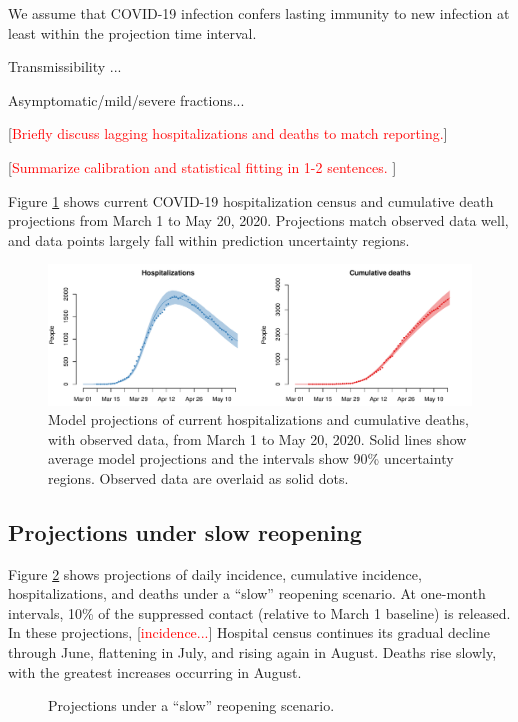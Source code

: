 \documentclass[11pt]{article}
\newcommand{\comment}[1]{[\textcolor{red}{#1}]}
\begin{document}
We assume that COVID-19 infection confers lasting immunity to new infection at least within the projection time interval.  

Transmissibility ...

Asymptomatic/mild/severe fractions...

\comment{Briefly discuss lagging hospitalizations and deaths to match reporting.}

\comment{Summarize calibration and statistical fitting in 1-2 sentences. }

Figure \ref{fig:calibration} shows current COVID-19 hospitalization census and cumulative death projections from March 1 to May 20, 2020.  Projections match observed data well, and data points largely fall within prediction uncertainty regions. 


\begin{figure}
\centering
\includegraphics[width=\textwidth]{figures/calibration.pdf}
\caption{Model projections of current hospitalizations and cumulative deaths, with observed data, from March 1 to May 20, 2020. Solid lines show average model projections and the intervals show 90\% uncertainty regions.  Observed data are overlaid as solid dots.} 
\label{fig:calibration}
\end{figure}


\subsection*{Projections under slow reopening} 

Figure \ref{fig:slow} shows projections of daily incidence, cumulative incidence, hospitalizations, and deaths under a ``slow'' reopening scenario. At one-month intervals, 10\% of the suppressed contact (relative to March 1 baseline) is released. In these projections, \comment{incidence...} Hospital census continues its gradual decline through June, flattening in July, and rising again in August. Deaths rise slowly, with the greatest increases occurring in August. 


\begin{figure}
\centering
\comment{slow reopen placeholder}
\caption{Projections under a ``slow'' reopening scenario. }
\label{fig:slow}
\end{figure}
\end{document}
